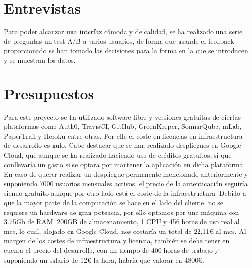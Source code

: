 \section {Entrevistas}
Para poder alcanzar una interfaz cómoda y de calidad, se ha realizado una serie de preguntas un \gls{test A/B} a varios usuarios, de forma que usando el feedback proporcionado se han tomado las decisiones para la forma en la que se introducen y se muestran los datos.

\section {Presupuestos}

Para este proyecto se ha utilizado software libre y versiones gratuitas de ciertas plataformas como Auth0, TravisCI, GitHub, GreenKeeper, SonnarQube, mLab, PaperTrail y Heroku entre otras. Por ello el coste en licencias en infraestructura de desarrollo es nulo. Cabe destacar que se han realizado despliegues en Google Cloud, que aunque se ha realizado haciendo uso de créditos gratuitos, si que conllevaría un gasto si se optara por mantener la aplicación en dicha plataforma.
En caso de querer realizar un despliegue permanente mencionado anteriormente y  suponiendo 7000 usuarios mensuales activos, el precio de la autenticación seguiría siendo gratuito aunque
por otro lado está el coste de la infraestructura. Debido a que la mayor parte de la computación
se hace en el lado del cliente, no se requiere un hardware de gran potencia, por ello optamos por
una máquina con 3.75Gb de RAM, 200GB de almacenamiento, 1 CPU y 456 horas de uso real al mes, lo cual, alojado en Google Cloud, nos costaría un total de 22,11€ al mes. Al margen de los costes de infraestructura y licencia, también se debe tener en cuenta el precio del desarrollo, con un tiempo  de 400 horas de trabajo y suponiendo un salario de 12€ la hora, habría que valorar en 4800€.
